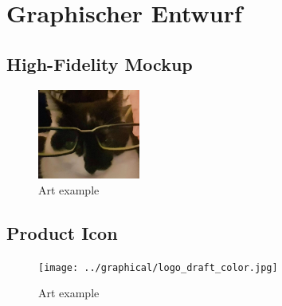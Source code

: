\documentclass[a4paper]{scrreprt}
\begin{document}

\chapter{Graphischer Entwurf} 

\section{High-Fidelity Mockup}
\begin{figure}[h]
\centering
\includegraphics[width=0.3\textwidth]{../graphical/test.jpg}
\caption{\label{fig:art1} Art example}
\end{figure}

\section{Product Icon}
\begin{figure}[h]
\centering
\texttt{[image: ../graphical/logo\_draft\_color.jpg]}
\caption{\label{fig:art2} Art example}
\end{figure}



\end{document}

